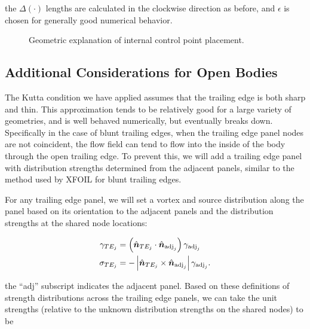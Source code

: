 \where the \(\Delta (\cdot)\) lengths are calculated in the clockwise direction as before, and \(\epsilon\) is chosen for generally good numerical behavior.

\begin{figure}
    \centering
    
    \caption{Geometric explanation of internal control point placement.}
    \label{fig:pseudocplocation}
\end{figure}

\subsection{Additional Considerations for Open Bodies}

The Kutta condition we have applied assumes that the trailing edge is both sharp and thin.
%
This approximation tends to be relatively good for a large variety of geometries, and is well behaved numerically, but eventually breaks down.
%
Specifically in the case of blunt trailing edges, when the trailing edge panel nodes are not coincident, the flow field can tend to flow into the inside of the body through the open trailing edge.
%
To prevent this, we will add a trailing edge panel with distribution strengths determined from the adjacent panels, similar to the method used by XFOIL for blunt trailing edges.

For any trailing edge panel, we will set a vortex and source distribution along the panel based on its orientation to the adjacent panels and the distribution strengths at the shared node locations:

\begin{align}
    \gamma_{TE_j} &= \left(\hat{\vect{n}}_{TE_j} \cdot \hat{\vect{n}}_{\text{adj}_j}\right)\gamma_{\text{adj}_j} \\ %
    \sigma_{TE_j} &= -\left|\hat{\vect{n}}_{TE_j} \times \hat{\vect{n}}_{\text{adj}_j}\right|\gamma_{\text{adj}_j}. %
\end{align}

\where the ``adj'' subscript indicates the adjacent panel.
%
Based on these definitions of strength distributions across the trailing edge panels, we can take the unit strengths (relative to the unknown distribution strengths on the shared nodes) to be

